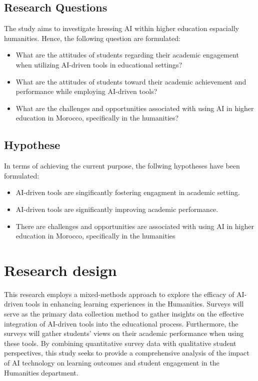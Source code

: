 \subsection{Research Questions}
The study aims to investigate hressing AI within higher education espacially humanities. Hence,
the following question are formulated:
\begin{itemize}
	\item What are the attitudes of students regarding their academic engagement when utilizing AI-driven tools in educational settings?
	\item What are the attitudes of students toward their academic achievement and performance while employing AI-driven tools?
	\item What are the challenges and opportunities associated
	      with using AI in higher education in Morocco,
	      specifically in the humanities?
\end{itemize}

\subsection{Hypothese}
In terms of achieving the current purpose, the follwing hypotheses have been formulated:
\begin{itemize}
	\item AI-driven tools are singificantly fostering engagment in academic setting.
	\item AI-driven tools are significantly improving academic performance.
	\item There are challenges and opportunities are associated with using AI in higher education
	      in Morocco, specifically in the humanities
\end{itemize}

\section{Research design}
This research employs a mixed-methods approach to explore the efficacy of AI-driven
tools in enhancing learning experiences in the Humanities. Surveys will serve as the
primary data collection method to gather insights on the effective integration of AI-driven
tools into the educational process. Furthermore, the surveys will gather students' views on
their academic performance when using these tools. By combining quantitative survey data with
qualitative student perspectives, this study seeks to provide a comprehensive analysis of the
impact of AI technology on learning outcomes and student engagement in the Humanities department.

